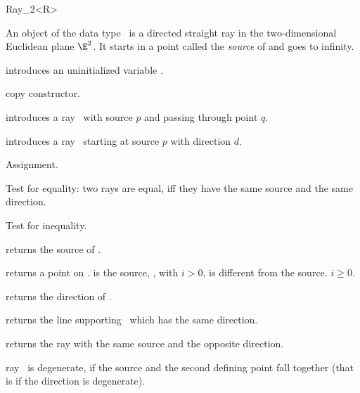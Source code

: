 \begin{ccRefClass}{Ray_2<R>}

\ccDefinition
An object  of the data type \ccRefName\ is a directed
straight ray in the two-dimensional Euclidean plane $\E^2$. It starts
in a  point called the {\em source} of   and goes to infinity.

\ccCreation
{}


\ccHidden {}
             {introduces an uninitialized variable \ccVar.}

\ccHidden {}
 	    {copy constructor.}

            {introduces a ray \ccVar\ 
             with source $p$ and passing through point $q$.}

            {introduces a ray \ccVar\ starting at source $p$ with 
             direction $d$.}

\ccOperations

\ccHidden {}
        {Assignment.}

       {Test for equality: two rays are equal, iff they have the same 
        source and the same direction.}

       {Test for inequality.}

       {returns the source of \ccVar.}

       {returns a point on \ccVar.  is the source,
        \ccStyle{point(i)}, with $i>0$, is different from the 
        source. \ccPrecond $i \geq 0$.}

       {returns the direction of \ccVar.}

       {returns the line supporting \ccVar\ which has the same direction.}

       {returns the ray with the same source and the opposite direction.}

\ccPredicates

       {ray \ccVar\ is degenerate, if the source and the second defining
        point fall together (that is if the direction is degenerate).}


\end{ccRefClass}
